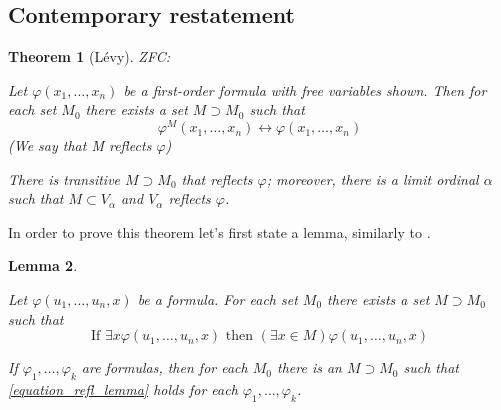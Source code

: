 \documentclass[12pt,a4paper]{article}
\newtheorem{theorem}{Theorem}[section]
\newtheorem{lemma}[theorem]{Lemma}
\renewcommand{\iff}{\leftrightarrow}
\newcommand{\bce}{\begin{compactenum}}
\newcommand{\ece}{\end{compactenum}}
\begin{document}

\subsection{Contemporary restatement} %


\medskip

\begin{theorem}[L{\'e}vy] \label{th:refl} ZFC: 
\bce[(i)]
\item Let $\varphi(x_1, \ldots, x_n)$ be a first-order formula with free variables shown. Then for each set $M_0$ there exists a set $M \supset M_0$ such that
\begin{equation}
\varphi^M (x_1,\ldots,x_n) \iff \varphi(x_1,\ldots,x_n)
\end{equation}
(We say that M reflects $\varphi$)
\item There is transitive $M \supset M_0$ that reflects $\varphi$; moreover, there is a limit ordinal $\alpha$ such that $M \subset V_\alpha$ and $V_\alpha$ reflects $\varphi$.
\ece
\end{theorem}

In order to prove this theorem let's first state a lemma, similarly to \cite{JechBook}.
\begin{lemma}
\bce[(i)]
\item Let $\varphi(u_1,\ldots,u_n,x)$ be a formula. For each set $M_0$ there exists a set $M \supset M_0$ such that
\begin{equation}\label{equation_refl_lemma}
\mbox{If }\exists x \varphi(u_1,\ldots,u_n,x) \mbox{ then } (\exists x \in M)\varphi (u_1,\ldots,u_n,x)
\end{equation}
\item If $\varphi_1,\ldots,\varphi_k$ are formulas, then for each $M_0$ there is an $M \supset M_0$ such that \ref{equation_refl_lemma} holds for each $\varphi_1,\ldots,\varphi_k$.
\ece
\end{lemma}
\end{document}
